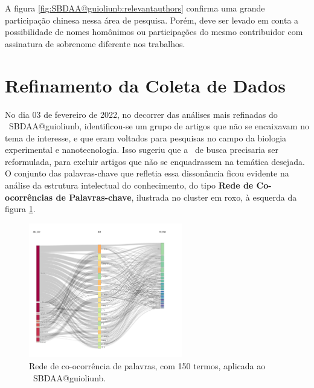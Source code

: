 A figura \ref{fig:SBDAA@guioliunb:relevantauthors} confirma uma grande participação chinesa nessa área de pesquisa. Porém, deve ser levado em conta a possibilidade de nomes homônimos ou participações do mesmo contribuidor com assinatura de sobrenome diferente nos trabalhos.

\section{Refinamento da Coleta de Dados}

No dia 03 de fevereiro de 2022, no decorrer das análises mais refinadas do \dataset\ SBDAA@guioliunb, identificou-se um grupo de artigos que não se encaixavam no tema de interesse, e que eram voltados para pesquisas no campo da biologia experimental e nanotecnologia. Isso sugeriu que a \query\  de busca precisaria ser reformulada, para excluir artigos que não se enquadrassem na temática desejada.
O conjunto das palavras-chave que refletia essa dissonância ficou evidente na análise da estrutura intelectual do conhecimento, do tipo \textbf{Rede de Co-ocorrências de Palavras-chave}, ilustrada no cluster em roxo, à esquerda da figura \ref{fig:SBDAA@guioliunb:redecoocorr-150-termos}.

\begin{figure}[htp]
    \centering
    \includegraphics[clip=true,trim={9cm 0cm 7cm 0cm },width=0.6\textwidth]{experiments/guioliunb/AnaliseBibliometrica/SocialBigDataAnalysis/3FSE-countriesXauthorsXtitles.png}
    \caption{Rede de co-ocorrência de palavras, com 150 termos, aplicada ao \dataset\   SBDAA@guioliunb.}
    \label{fig:SBDAA@guioliunb:redecoocorr-150-termos}
\end{figure}

